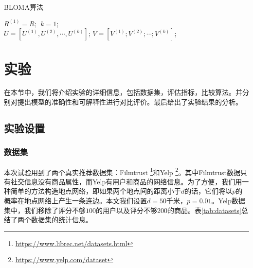 \begin{algorithm}[!t]
\caption{BLOMA算法}
\label{algorithm}
{}
\BlankLine
$R^{(1)} = R; ~~k=1$;\\
$U = [U^{(1)}, U^{(2)}, \cdots, U^{(k)}]$; $V = [V^{(1)}; V^{(2)}; \cdots; V^{(k)}]$;\\
\end{algorithm}


\section{实验}
在本节中，我们将介绍实验的详细信息，包括数据集，评估指标，比较算法。并分别对提出模型的准确性和可解释性进行对比评价。最后给出了实验结果的分析。

\subsection{实验设置}

\subsubsection{数据集}
本次试验用到了两个真实推荐数据集：Filmtrust \footnote{\url{https://www.librec.net/datasets.html}}和Yelp \footnote{\url{https://www.yelp.com/dataset}}。其中Filmtrust数据只有社交信息没有商品属性，而Yelp有用户和商品的网络信息。为了方便，我们用一种简单的方法构造地点网络，即如果两个地点间的距离小于$d$的话，它们将以$p$的概率在地点网络上产生一条连边。本文我们设置$d=50$千米，$p = 0.01$。Yelp数据集中，我们移除了评分不够$100$的用户以及评分不够$200$的商品。表\ref{tab:datasets}总结了两个数据集的统计信息。

